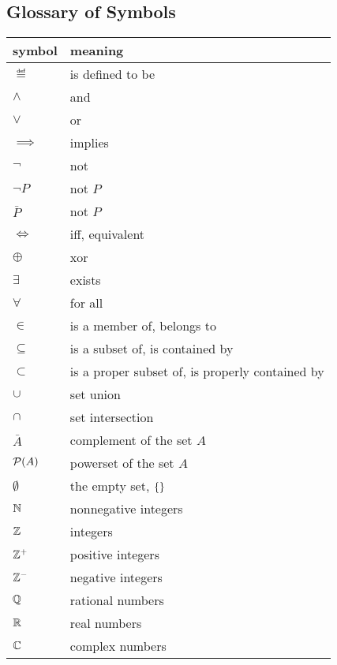 \subsection{Glossary of Symbols}
\begin{center}
\begin{tabular}{ll}
symbol &  meaning\\
\hline
$\eqdef$ & is defined to be\\
$\land$ & and\\
$\lor$ & or\\
$\implies$ & implies\\
$\neg$    & not\\
$\neg{P}$ & not $P$\\
$\bar{P}$ & not $P$\\
$\iff$    & iff, equivalent\\
$\oplus$   & xor\\
$\exists$ & exists\\
$\forall$ & for all\\
$\in$   &  is a member of, belongs to\\
$\subseteq$ & is a subset of, is contained by\\
$\subset$ & is a proper subset of, is properly contained by\\
$\cup$  & set union\\
$\cap$ & set intersection\\
$\bar{A}$ & complement of the set $A$\\
$\mathcal{P}(A)$ & powerset of the set $A$\\
$\emptyset$ & the empty set, $\left\{\right\}$\\
$\mathbb{N}$ & nonnegative integers \\
$\mathbb{Z}$ & integers\\
$\mathbb{Z}^+$ & positive integers\\
$\mathbb{Z}^-$ & negative integers\\
$\mathbb{Q}$ & rational numbers\\
$\mathbb{R}$ & real numbers\\
$\mathbb{C}$ & complex numbers\\
\end{tabular}
\end{center}

\begin{problems}
\homeworkproblems
{}
\end{problems}


